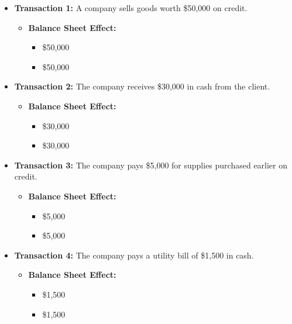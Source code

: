 \documentclass[12pt,a4paper]{book}
\begin{document}
\begin{itemize}
    \item \textbf{Transaction 1:} A company sells goods worth \$50,000 on credit.
    \begin{itemize}
        \item \textbf{Balance Sheet Effect:} 
        \begin{itemize}
            \item {} \$50,000
            \item {} \$50,000
        \end{itemize}
    \end{itemize}
    
    \item \textbf{Transaction 2:} The company receives \$30,000 in cash from the client.
    \begin{itemize}
        \item \textbf{Balance Sheet Effect:} 
        \begin{itemize}
            \item {} \$30,000
            \item {} \$30,000
        \end{itemize}
    \end{itemize}

    \item \textbf{Transaction 3:} The company pays \$5,000 for supplies purchased earlier on credit.
    \begin{itemize}
        \item \textbf{Balance Sheet Effect:} 
        \begin{itemize}
            \item {} \$5,000
            \item {} \$5,000
        \end{itemize}
    \end{itemize}

    \item \textbf{Transaction 4:} The company pays a utility bill of \$1,500 in cash.
    \begin{itemize}
        \item \textbf{Balance Sheet Effect:} 
        \begin{itemize}
            \item {} \$1,500
            \item {} \$1,500
        \end{itemize}
    \end{itemize}
\end{itemize}
\end{document}
